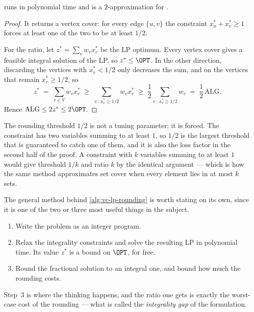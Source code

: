 \begin{theorem}\label{thm:vc-lp-rounding}
 runs in polynomial time and is a $2$-approximation
for .
\end{theorem}

\begin{proof}
It returns a vertex cover: for every edge $\{u,v\}$ the constraint
$x^{*}_u + x^{*}_v \ge 1$ forces at least one of the two to be at least $1/2$.

For the ratio, let $z^{*} = \sum_v w_v x^{*}_v$ be the LP optimum. Every vertex
cover gives a feasible integral solution of the LP, so $z^{*} \le \OPT$. In the
other direction, discarding the vertices with $x^{*}_v < 1/2$ only decreases the
sum, and on the vertices that remain $x^{*}_v \ge 1/2$, so
\[
  z^{*} \;=\; \sum_{v \in V} w_v x^{*}_v
        \;\ge\; \sum_{v \,:\, x^{*}_v \ge 1/2} w_v x^{*}_v
        \;\ge\; \frac12 \sum_{v \,:\, x^{*}_v \ge 1/2} w_v
        \;=\; \frac12\,\mathrm{ALG}.
\]
Hence $\mathrm{ALG} \le 2 z^{*} \le 2\OPT$.
\end{proof}

\begin{intuition}
The rounding threshold $1/2$ is not a tuning parameter; it is forced. The
constraint has two variables summing to at least $1$, so $1/2$ is the largest
threshold that is guaranteed to catch one of them, and it is also the loss
factor in the second half of the proof. A constraint with $k$ variables summing
to at least $1$ would give threshold $1/k$ and ratio $k$ by the identical
argument --- which is how the same method approximates set cover when every
element lies in at most $k$ sets.
\end{intuition}

The general method behind \cref{alg:vc-lp-rounding} is worth stating on its
own, since it is one of the two or three most useful things in the subject.

\begin{enumerate}[leftmargin=*]
  \item Write the problem as an integer program.
  \item Relax the integrality constraints and solve the resulting LP in
        polynomial time. Its value $z^{*}$ is a bound on $\OPT$, for free.
  \item Round the fractional solution to an integral one, and bound how much
        the rounding costs.
\end{enumerate}
Step~3 is where the thinking happens, and the ratio one gets is exactly the
worst-case cost of the rounding --- what is called the \emph{integrality gap}
of the formulation.

